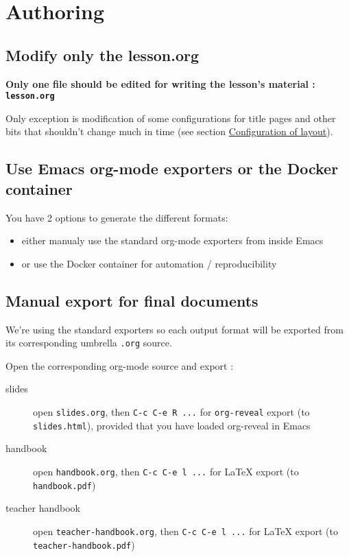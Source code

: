 \documentclass[a4paper]{article}
\begin{document}
\section{Authoring}
\label{sec:org7c9c48f}
\subsection{Modify only the lesson.org}
\label{sec:orgfb41172}

\textbf{Only one file should be edited for writing the lesson's material : \texttt{lesson.org}}

Only exception is modification of some configurations for title pages
and other bits that shouldn't change much in time (see section \hyperref[sec:org2fc34d5]{Configuration of layout}).

\subsection{Use Emacs org-mode exporters or the Docker container}
\label{sec:orgf888d8c}

You have 2 options to generate the different formats:
\begin{itemize}
\item either manualy use the standard org-mode exporters from inside Emacs
\item or use the Docker container for automation / reproducibility
\end{itemize}

\subsection{Manual export for final documents}
\label{sec:org42814da}

We're using the standard exporters so each output format will be exported from its corresponding umbrella \texttt{.org} source.

Open the corresponding org-mode source and export :

\begin{description}
\item[{slides}] open \texttt{slides.org}, then \texttt{C-c C-e R ...} for \texttt{org-reveal} export (to \texttt{slides.html}), provided that you have loaded org-reveal in Emacs
\item[{handbook}] open \texttt{handbook.org}, then \texttt{C-c C-e l ...} for \LaTeX{} export (to \texttt{handbook.pdf})
\item[{teacher handbook}] open \texttt{teacher-handbook.org}, then \texttt{C-c C-e l ...} for \LaTeX{} export (to \texttt{teacher-handbook.pdf})
\end{description}
\end{document}
